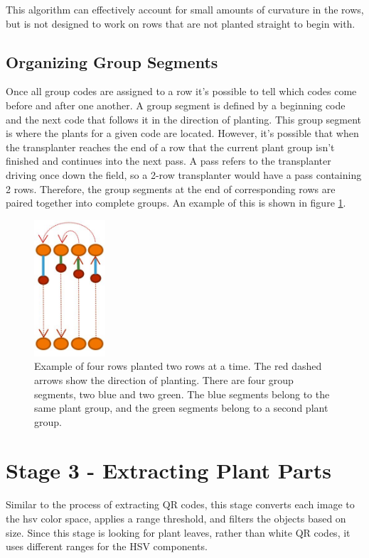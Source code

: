 This algorithm can effectively account for small amounts of curvature in the rows, but is not designed to work on rows that are not planted straight to begin with.

\subsection{Organizing Group Segments}

Once all group codes are assigned to a row it's possible to tell which codes come before and after one another.  A group segment is defined by a beginning code and the next code that follows it in the direction of planting.  This group segment is where the plants for a given code are located.  However, it's possible that when the transplanter reaches the end of a row that the current plant group isn't finished and continues into the next pass.  A pass refers to the transplanter driving once down the field, so a 2-row transplanter would have a pass containing 2 rows.  Therefore, the group segments at the end of corresponding rows are paired together into complete groups.  An example of this is shown in figure \ref{figure:group_segments}.

\begin{figure}
	\centering
    \includegraphics[height=2in]{figures/group_segments.jpg}
    \caption[Group segments]{Example of four rows planted two rows at a time.  The red dashed arrows show the direction of planting.  There are four group segments, two blue and two green.  The blue segments belong to the same plant group, and the green segments belong to a second plant group.}
    \label{figure:group_segments}
\end{figure}

\section{Stage 3 - Extracting Plant Parts}
\label{processing-stage3}

Similar to the process of extracting QR codes, this stage converts each image to the \ac{hsv} color space, applies a range threshold, and filters the objects based on size.  Since this stage is looking for plant leaves, rather than white QR codes, it uses different ranges for the HSV components.  

